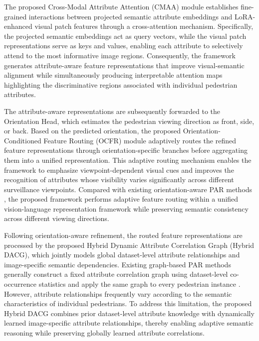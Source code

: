 \documentclass{ieeeaccess}
\begin{document}
The proposed Cross-Modal Attribute Attention (CMAA) module establishes fine-grained interactions between projected semantic attribute embeddings and LoRA-enhanced visual patch features through a cross-attention mechanism. Specifically, the projected semantic embeddings act as query vectors, while the visual patch representations serve as keys and values, enabling each attribute to selectively attend to the most informative image regions. Consequently, the framework generates attribute-aware feature representations that improve visual-semantic alignment while simultaneously producing interpretable attention maps highlighting the discriminative regions associated with individual pedestrian attributes.

The attribute-aware representations are subsequently forwarded to the Orientation Head, which estimates the pedestrian viewing direction as front, side, or back. Based on the predicted orientation, the proposed Orientation-Conditioned Feature Routing (OCFR) module adaptively routes the refined feature representations through orientation-specific branches before aggregating them into a unified representation. This adaptive routing mechanism enables the framework to emphasize viewpoint-dependent visual cues and improves the recognition of attributes whose visibility varies significantly across different surveillance viewpoints. Compared with existing orientation-aware PAR methods \cite{bib5}, the proposed framework performs adaptive feature routing within a unified vision-language representation framework while preserving semantic consistency across different viewing directions.

Following orientation-aware refinement, the routed feature representations are processed by the proposed Hybrid Dynamic Attribute Correlation Graph (Hybrid DACG), which jointly models global dataset-level attribute relationships and image-specific semantic dependencies. Existing graph-based PAR methods generally construct a fixed attribute correlation graph using dataset-level co-occurrence statistics and apply the same graph to every pedestrian instance \cite{bib3,bib4,bib5}. However, attribute relationships frequently vary according to the semantic characteristics of individual pedestrians. To address this limitation, the proposed Hybrid DACG combines prior dataset-level attribute knowledge with dynamically learned image-specific attribute relationships, thereby enabling adaptive semantic reasoning while preserving globally learned attribute correlations.
\end{document}

